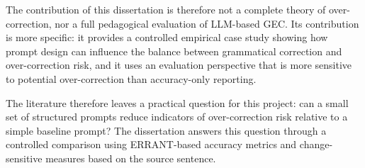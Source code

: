 The contribution of this dissertation is therefore not a complete theory of over-correction, nor a full pedagogical evaluation of LLM-based GEC. Its contribution is more specific: it provides a controlled empirical case study showing how prompt design can influence the balance between grammatical correction and over-correction risk, and it uses an evaluation perspective that is more sensitive to potential over-correction than accuracy-only reporting.

The literature therefore leaves a practical question for this project: can a small set of structured prompts reduce indicators of over-correction risk relative to a simple baseline prompt? The dissertation answers this question through a controlled comparison using ERRANT-based accuracy metrics and change-sensitive measures based on the source sentence.

